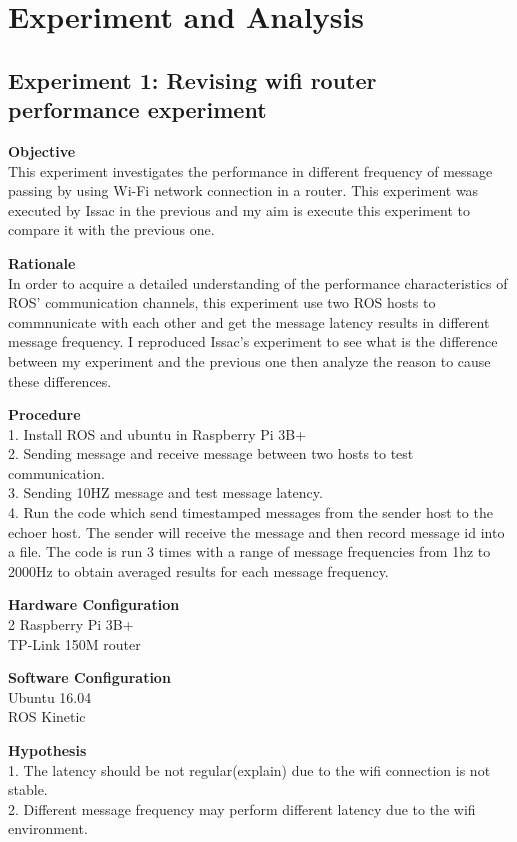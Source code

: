 \documentclass{mproj}
\begin{document}
\chapter{Experiment and Analysis}

\section{Experiment 1: Revising wifi router performance experiment}
\textbf{Objective} \\
This experiment investigates the performance in different frequency of message passing by using Wi-Fi network connection in a router.  This experiment was executed by Issac in the previous and my aim is execute this experiment to compare it with the previous one.

\textbf{Rationale} \\
In order to acquire a detailed understanding of the performance characteristics of ROS’ communication channels, this experiment use two ROS hosts to commnunicate with each other and get the message latency results in different message frequency. I reproduced Issac's experiment to see what is the difference between my experiment and the previous one then analyze the reason to cause these differences.

\textbf{Procedure} \\
1. Install ROS and ubuntu in Raspberry Pi 3B+ \\
2. Sending message and receive message between two hosts to test communication. \\
3. Sending 10HZ message and test message latency. \\
4. Run the code which send timestamped messages from the sender host to the echoer host. The sender will receive the message and then record message id into a file. The code is run 3 times with a range of message frequencies from 1hz to 2000Hz to obtain averaged results for each message frequency.

\textbf{Hardware Configuration} \\
2 Raspberry Pi 3B+ \\
TP-Link 150M router

\textbf{Software Configuration} \\
Ubuntu 16.04 \\
ROS Kinetic 

\textbf{Hypothesis} \\
1. The latency should be not regular(explain) due to the wifi connection is not stable. \\
2. Different message frequency may perform different latency due to the wifi environment.
\end{document}
